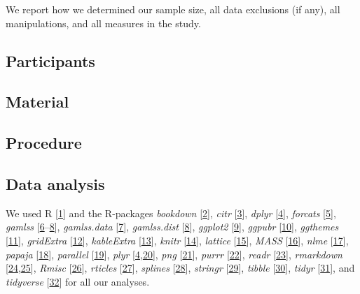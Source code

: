 \documentclass[10pt,letterpaper]{article}
\begin{document}
We report how we determined our sample size, all data exclusions (if any), all manipulations, and all measures in the study.

\hypertarget{participants}{%
\subsection{Participants}\label{participants}}

\hypertarget{material}{%
\subsection{Material}\label{material}}

\hypertarget{procedure}{%
\subsection{Procedure}\label{procedure}}

\hypertarget{data-analysis}{%
\subsection{Data analysis}\label{data-analysis}}

We used R {[}\protect\hyperlink{ref-R-base}{1}{]} and the R-packages \emph{bookdown} {[}\protect\hyperlink{ref-R-bookdown}{2}{]}, \emph{citr} {[}\protect\hyperlink{ref-R-citr}{3}{]}, \emph{dplyr} {[}\protect\hyperlink{ref-R-dplyr}{4}{]}, \emph{forcats} {[}\protect\hyperlink{ref-R-forcats}{5}{]}, \emph{gamlss} {[}\protect\hyperlink{ref-R-gamlss}{6}--\protect\hyperlink{ref-R-gamlss.dist}{8}{]}, \emph{gamlss.data} {[}\protect\hyperlink{ref-R-gamlss.data}{7}{]}, \emph{gamlss.dist} {[}\protect\hyperlink{ref-R-gamlss.dist}{8}{]}, \emph{ggplot2} {[}\protect\hyperlink{ref-R-ggplot2}{9}{]}, \emph{ggpubr} {[}\protect\hyperlink{ref-R-ggpubr}{10}{]}, \emph{ggthemes} {[}\protect\hyperlink{ref-R-ggthemes}{11}{]}, \emph{gridExtra} {[}\protect\hyperlink{ref-R-gridExtra}{12}{]}, \emph{kableExtra} {[}\protect\hyperlink{ref-R-kableExtra}{13}{]}, \emph{knitr} {[}\protect\hyperlink{ref-R-knitr}{14}{]}, \emph{lattice} {[}\protect\hyperlink{ref-R-lattice}{15}{]}, \emph{MASS} {[}\protect\hyperlink{ref-R-MASS}{16}{]}, \emph{nlme} {[}\protect\hyperlink{ref-R-nlme}{17}{]}, \emph{papaja} {[}\protect\hyperlink{ref-R-papaja}{18}{]}, \emph{parallel} {[}\protect\hyperlink{ref-R-parallel}{19}{]}, \emph{plyr} {[}\protect\hyperlink{ref-R-dplyr}{4},\protect\hyperlink{ref-R-plyr}{20}{]}, \emph{png} {[}\protect\hyperlink{ref-R-png}{21}{]}, \emph{purrr} {[}\protect\hyperlink{ref-R-purrr}{22}{]}, \emph{readr} {[}\protect\hyperlink{ref-R-readr}{23}{]}, \emph{rmarkdown} {[}\protect\hyperlink{ref-R-rmarkdown_a}{24},\protect\hyperlink{ref-R-rmarkdown_b}{25}{]}, \emph{Rmisc} {[}\protect\hyperlink{ref-R-Rmisc}{26}{]}, \emph{rticles} {[}\protect\hyperlink{ref-R-rticles}{27}{]}, \emph{splines} {[}\protect\hyperlink{ref-R-splines}{28}{]}, \emph{stringr} {[}\protect\hyperlink{ref-R-stringr}{29}{]}, \emph{tibble} {[}\protect\hyperlink{ref-R-tibble}{30}{]}, \emph{tidyr} {[}\protect\hyperlink{ref-R-tidyr}{31}{]}, and \emph{tidyverse} {[}\protect\hyperlink{ref-R-tidyverse}{32}{]} for all our analyses.
\end{document}
